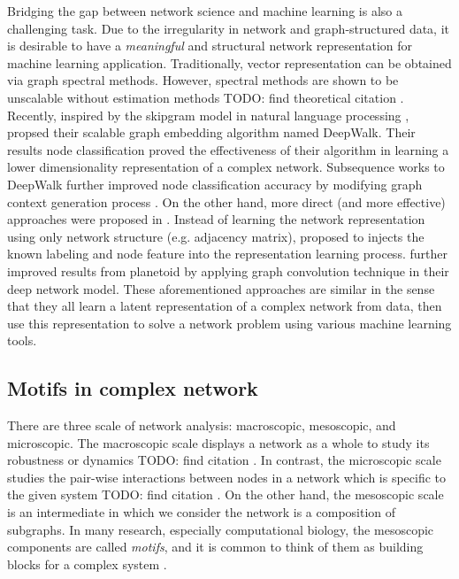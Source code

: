 \documentclass{article}
\theoremstyle{definition}
\begin{document}
Bridging the gap between network science and machine learning
is also a challenging task. Due to the irregularity in network and 
graph-structured data, it is desirable to have a \emph{meaningful}
and structural network representation for machine learning application. 
Traditionally, vector representation can be obtained via graph spectral methods.
However, spectral methods are shown to be unscalable without estimation
methods TODO: find theoretical citation \cite{deepwalk,node2vec}.
Recently, inspired by the skipgram model in natural language processing
\cite{skipgram}, \citeauthor{deepwalk} propsed their scalable graph
embedding algorithm named DeepWalk. Their results node classification
proved the effectiveness of their algorithm in learning a lower dimensionality 
representation of a complex network. Subsequence works to DeepWalk
further improved node classification accuracy by modifying graph 
context generation process \cite{line,grarep,node2vec}. On the other
hand, more direct (and more effective) approaches were proposed in
\cite{planetoid,gcn}. Instead of learning the network representation
using only network structure (e.g. adjacency matrix), \citeauthor{planetoid}
proposed to injects the known labeling and node feature into the
representation learning process. \citeauthor{gcn} further improved
results from planetoid \cite{planetoid} by applying graph convolution
technique in their deep network model. These aforementioned approaches 
are similar in the sense that they all learn a latent representation 
of a complex network from data, then use this representation to solve 
a network problem using various machine learning tools. 

\subsection{Motifs in complex network}

There are three scale of network analysis: macroscopic, mesoscopic, 
and microscopic. The macroscopic scale displays a network as a whole to
study its robustness \cite{callaway2000network} or dynamics TODO: find citation \cite{barabasi2014network}.
In contrast, the microscopic scale studies the pair-wise interactions
between nodes in a network which is specific to the given system
TODO: find citation \cite{physicnet}. On the other hand, the mesoscopic
scale is an intermediate in which we consider the network is a composition of
subgraphs. In many research, especially computational biology, the
mesoscopic components are called \emph{motifs}, and it is common
to think of them as building blocks for a complex system \cite{motifblockmilo}.
\end{document}
